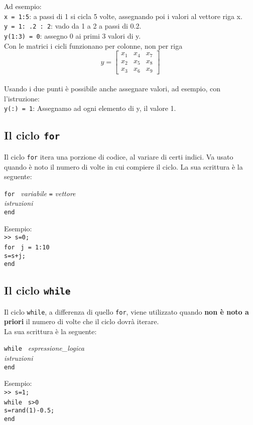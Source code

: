 Ad esempio: \\
\texttt{x = 1:5}: a passi di 1 si cicla 5 volte, assegnando poi i valori al vettore riga x. \\
\texttt{y = 1: .2 : 2}: vado da 1 a 2 a passi di 0.2. \\
\texttt{y(1:3) = 0}: assegno 0 ai primi 3 valori di y. \\

Con le matrici i cicli funzionano per colonne, non per riga\\

$$ y = 
\begin{bmatrix}
    x_{1}       & x_{4} & x_{7} \\
    x_{2}       & x_{5} & x_{8} \\
    x_{3}       & x_{6} & x_{9}
\end{bmatrix}$$
\\
Usando i due punti è possibile anche assegnare valori, ad esempio, con l'istruzione:\\
\texttt{y(:) = 1}: Assegnamo ad ogni elemento di y, il valore 1.

\subsection{Il ciclo \texttt{for}}
Il ciclo \texttt{for} itera una porzione di codice, al variare di certi indici. Va usato quando è noto il numero di 
volte in cui compiere il ciclo. La sua scrittura è la seguente:
\begin{center}
\texttt{for } \textit{variabile} \texttt{=} \textit{vettore} \\ 
\hspace{1.5cm}\textit{istruzioni}  \\
\hspace{-3.5cm}\texttt{end}
\end{center}

Esempio: \\
\texttt{>> s=0;} \\
\texttt{for } \texttt{j = 1:10} \\ 
\hspace{1cm}\texttt{s=s+j;}  \\
\texttt{end}

\subsection{Il ciclo \texttt{while}}
Il ciclo \texttt{while}, a differenza di quello \texttt{for}, viene utilizzato quando \textbf{non è noto a priori} il 
numero di volte che il ciclo dovrà iterare. \\
La sua scrittura è la seguente:
\begin{center}
\texttt{while } \textit{espressione\_logica} \\ 
\hspace{1.5cm}\textit{istruzioni}  \\
\hspace{-4.1cm}\texttt{end}
\end{center}

Esempio: \\
\texttt{>> s=1;} \\
\texttt{while } \texttt{s>0} \\ 
\hspace{1cm}\texttt{s=rand(1)-0.5;}  \\
\texttt{end}